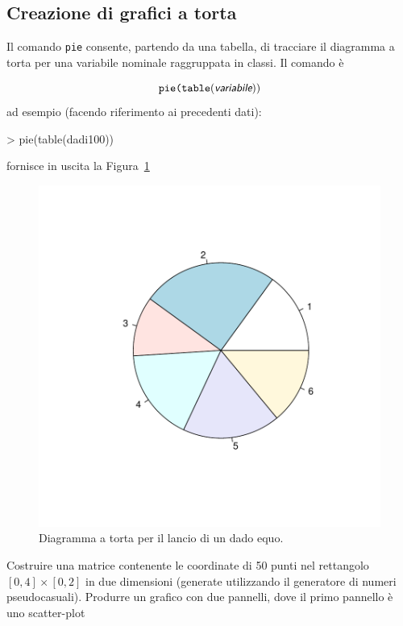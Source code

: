 \documentclass[onecolumn,12pt]{book}
\newcommand{\varia}[1]{\textsl{\textsf{#1}}}
\begin{document}
\subsection{Creazione di grafici a torta}

Il comando \texttt{pie} consente, partendo da una tabella, di tracciare il diagramma a torta per una variabile nominale raggruppata in classi. Il comando \`e

\begin{equation*}\texttt{pie(table}(\varia{variabile} ))
\end{equation*}
ad esempio (facendo riferimento ai precedenti dati):
\begin{Schunk}
\begin{Sinput}
> pie(table(dadi100))
\end{Sinput}
\end{Schunk}
fornisce in uscita  la Figura~\ref{fig:pie}
\begin{figure}[htbp]
\begin{center}
\includegraphics{RbookParte2-044}
\caption{Diagramma a torta per il lancio di un dado equo.}
\label{fig:pie}
\end{center}
\end{figure}
\begin{shaded}{Costruire una matrice contenente le coordinate di 50 punti nel rettangolo $[0,4]\times [0,2]$ in due dimensioni (generate utilizzando il generatore di numeri pseudocasuali). Produrre un grafico con due pannelli, dove il primo pannello \`e uno scatter-plot}
\end{shaded}
\end{document}
